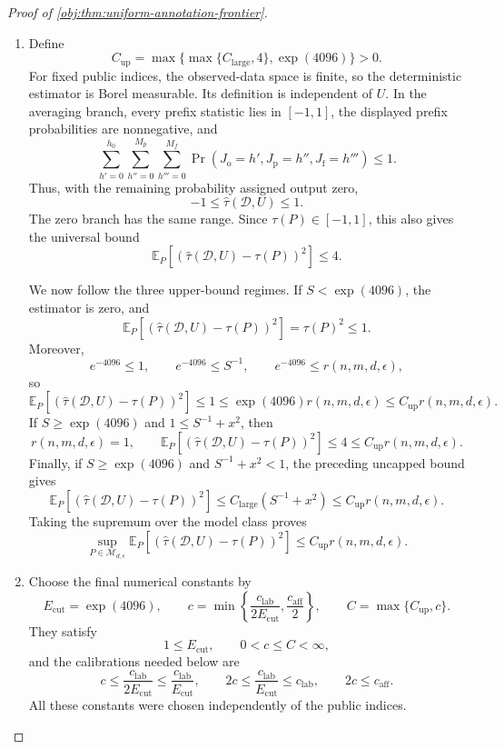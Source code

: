 \documentclass[11pt]{article}
\begin{document}
\begin{proof}[Proof of \cref{obj:thm:uniform-annotation-frontier}]
\begin{enumerate}
\item Define
\[
C_{\mathrm{up}}
=\max\{\max\{C_{\mathrm{large}},4\},\exp(4096)\}>0.
\]
For fixed public indices, the observed-data space is finite, so the deterministic estimator is Borel measurable. Its definition is independent of \(U\). In the averaging branch, every prefix statistic lies in \([-1,1]\), the displayed prefix probabilities are nonnegative, and
\[
\sum_{h'=0}^{h_0}\sum_{h''=0}^{M_p}\sum_{h'''=0}^{M_f}
\Pr(J_{\mathrm o}=h',J_{\mathrm p}=h'',J_{\mathrm f}=h''')
\le1.
\]
Thus, with the remaining probability assigned output zero,
\[
-1\le\widehat\tau(\mathcal D,U)\le1.
\]
The zero branch has the same range. Since \(\tau(P)\in[-1,1]\), this also gives the universal bound
\[
\mathbb E_P[
(\widehat\tau(\mathcal D,U)-\tau(P))^2]\le4.
\]

We now follow the three upper-bound regimes. If \(S<\exp(4096)\), the estimator is zero, and
\[
\mathbb E_P[
(\widehat\tau(\mathcal D,U)-\tau(P))^2]
=\tau(P)^2\le1.
\]
Moreover,
\[
e^{-4096}\le1,\qquad e^{-4096}\le S^{-1},
\qquad
e^{-4096}\le r(n,m,d,\epsilon),
\]
so
\[
\mathbb E_P[
(\widehat\tau(\mathcal D,U)-\tau(P))^2]
\le1
\le\exp(4096)r(n,m,d,\epsilon)
\le C_{\mathrm{up}}r(n,m,d,\epsilon).
\]
If \(S\ge\exp(4096)\) and \(1\le S^{-1}+x^2\), then
\[
r(n,m,d,\epsilon)=1,
\qquad
\mathbb E_P[
(\widehat\tau(\mathcal D,U)-\tau(P))^2]
\le4\le C_{\mathrm{up}}r(n,m,d,\epsilon).
\]
Finally, if \(S\ge\exp(4096)\) and \(S^{-1}+x^2<1\), the preceding uncapped bound gives
\[
\mathbb E_P[
(\widehat\tau(\mathcal D,U)-\tau(P))^2]
\le C_{\mathrm{large}}(S^{-1}+x^2)
\le C_{\mathrm{up}}r(n,m,d,\epsilon).
\]
Taking the supremum over the model class proves
\[
\sup_{P\in\mathcal M_{d,\epsilon}}
\mathbb E_P[
(\widehat\tau(\mathcal D,U)-\tau(P))^2]
\le C_{\mathrm{up}}r(n,m,d,\epsilon).
\]

\item Choose the final numerical constants by
\[
E_{\mathrm{cut}}=\exp(4096),\qquad
c=\min\left\{
\frac{c_{\mathrm{lab}}}{2E_{\mathrm{cut}}},
\frac{c_{\mathrm{aff}}}{2}
\right\},
\qquad
C=\max\{C_{\mathrm{up}},c\}.
\]
They satisfy
\[
1\le E_{\mathrm{cut}},\qquad
0<c\le C<\infty,
\]
and the calibrations needed below are
\[
c\le\frac{c_{\mathrm{lab}}}{2E_{\mathrm{cut}}}
\le\frac{c_{\mathrm{lab}}}{E_{\mathrm{cut}}},
\qquad
2c\le\frac{c_{\mathrm{lab}}}{E_{\mathrm{cut}}}
\le c_{\mathrm{lab}},
\qquad
2c\le c_{\mathrm{aff}}.
\]
All these constants were chosen independently of the public indices.


\end{enumerate}
\end{proof}
\end{document}
